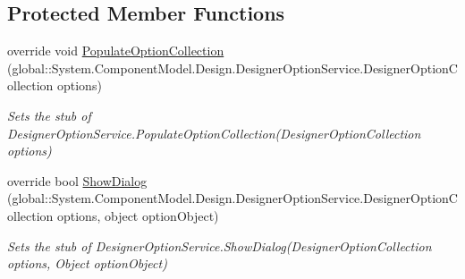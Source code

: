 \subsection*{Protected Member Functions}
\begin{DoxyCompactItemize}
\item 
override void \hyperlink{class_system_1_1_component_model_1_1_design_1_1_fakes_1_1_stub_designer_option_service_a2a504c0b1e396b1a6695c2acca025890}{Populate\-Option\-Collection} (global\-::\-System.\-Component\-Model.\-Design.\-Designer\-Option\-Service.\-Designer\-Option\-Collection options)
\begin{DoxyCompactList}\small\item\em Sets the stub of Designer\-Option\-Service.\-Populate\-Option\-Collection(\-Designer\-Option\-Collection options)\end{DoxyCompactList}\item 
override bool \hyperlink{class_system_1_1_component_model_1_1_design_1_1_fakes_1_1_stub_designer_option_service_a75e5594e64142d0396f5ab280ef19407}{Show\-Dialog} (global\-::\-System.\-Component\-Model.\-Design.\-Designer\-Option\-Service.\-Designer\-Option\-Collection options, object option\-Object)
\begin{DoxyCompactList}\small\item\em Sets the stub of Designer\-Option\-Service.\-Show\-Dialog(\-Designer\-Option\-Collection options, Object option\-Object)\end{DoxyCompactList}\end{DoxyCompactItemize}
